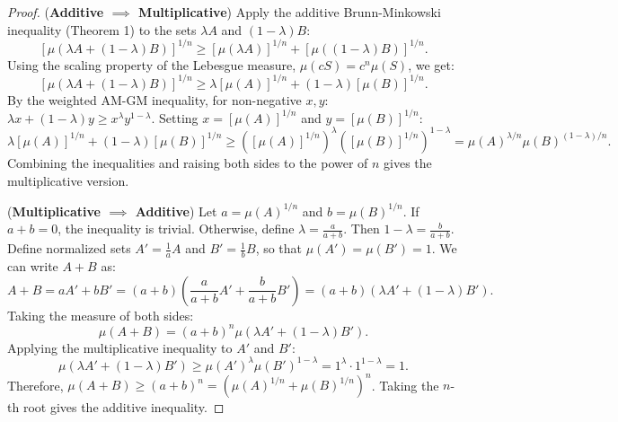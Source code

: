 \begin{proof}
(\textbf{Additive $\implies$ Multiplicative})
Apply the additive Brunn-Minkowski inequality (Theorem 1) to the sets $\lambda A$ and $(1-\lambda)B$:
$$[\mu(\lambda A + (1-\lambda)B)]^{1/n} \ge [\mu(\lambda A)]^{1/n} + [\mu((1-\lambda)B)]^{1/n}.$$
Using the scaling property of the Lebesgue measure, $\mu(c S) = c^n \mu(S)$, we get:
$$[\mu(\lambda A + (1-\lambda)B)]^{1/n} \ge \lambda[\mu(A)]^{1/n} + (1-\lambda)[\mu(B)]^{1/n}.$$
By the weighted AM-GM inequality, for non-negative $x, y$: $\lambda x + (1-\lambda)y \ge x^\lambda y^{1-\lambda}$. Setting $x = [\mu(A)]^{1/n}$ and $y = [\mu(B)]^{1/n}$:
$$\lambda[\mu(A)]^{1/n} + (1-\lambda)[\mu(B)]^{1/n} \ge ([\mu(A)]^{1/n})^\lambda ([\mu(B)]^{1/n})^{1-\lambda} = \mu(A)^{\lambda/n} \mu(B)^{(1-\lambda)/n}.$$
Combining the inequalities and raising both sides to the power of $n$ gives the multiplicative version.

(\textbf{Multiplicative $\implies$ Additive})
Let $a = \mu(A)^{1/n}$ and $b = \mu(B)^{1/n}$. If $a+b=0$, the inequality is trivial. Otherwise, define $\lambda = \frac{a}{a+b}$. Then $1-\lambda = \frac{b}{a+b}$. Define normalized sets $A' = \frac{1}{a}A$ and $B' = \frac{1}{b}B$, so that $\mu(A')=\mu(B')=1$.
We can write $A+B$ as:
$$A+B = aA' + bB' = (a+b) \left(\frac{a}{a+b}A' + \frac{b}{a+b}B'\right) = (a+b)(\lambda A' + (1-\lambda)B').$$
Taking the measure of both sides:
$$\mu(A+B) = (a+b)^n \mu(\lambda A' + (1-\lambda)B').$$
Applying the multiplicative inequality to $A'$ and $B'$:
$$\mu(\lambda A' + (1-\lambda)B') \ge \mu(A')^\lambda \mu(B')^{1-\lambda} = 1^\lambda \cdot 1^{1-\lambda} = 1.$$
Therefore, $\mu(A+B) \ge (a+b)^n = (\mu(A)^{1/n} + \mu(B)^{1/n})^n$. Taking the $n$-th root gives the additive inequality.
\end{proof}
